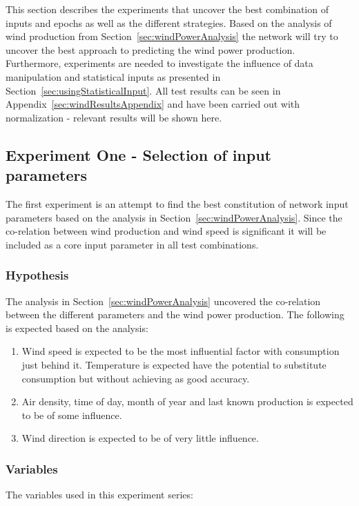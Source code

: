 This section describes the experiments that uncover the best combination of inputs and epochs as well as the different strategies. Based on the analysis of wind production from Section~\ref{sec:windPowerAnalysis} the network will try to uncover the best approach to predicting the wind power production. Furthermore, experiments are needed to investigate the influence of data manipulation and statistical inputs as presented in Section~\ref{sec:usingStatisticalInput}. All test results can be seen in Appendix~\ref{sec:windResultsAppendix} and have been carried out with normalization - relevant results will be shown here. 


\subsection{Experiment One - Selection of input parameters}
\label{sec:windPowerExperimentOne}
The first experiment is an attempt to find the best constitution of network input parameters based on the analysis in Section~\ref{sec:windPowerAnalysis}. Since the co-relation between wind production and wind speed is significant it will be included as a core input parameter in all test combinations.

\subsubsection{Hypothesis}
The analysis in Section~\ref{sec:windPowerAnalysis} uncovered the co-relation between the different parameters and the wind power production. The following is expected based on the analysis:

\begin{enumerate}
\item Wind speed is expected to be the most influential factor with consumption just behind it. Temperature is expected have the potential to substitute consumption but without achieving as good accuracy. 
\item Air density, time of day, month of year and last known production is expected to be of some influence.
\item Wind direction is expected to be of very little influence.
\end{enumerate}

\subsubsection{Variables}
The variables used in this experiment series:

